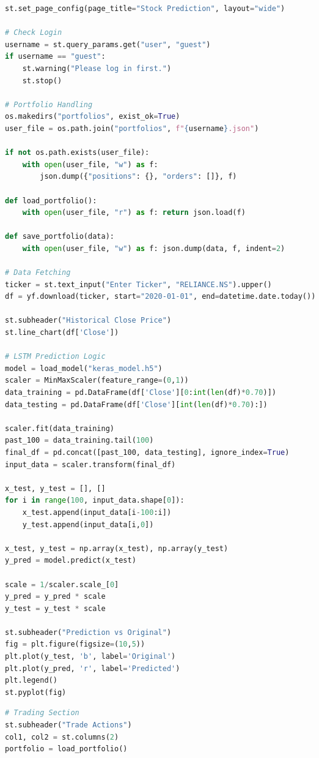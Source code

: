 \documentclass[12pt, a4paper]{report}
\begin{document}
\begin{spacing}{1.2}
\begin{lstlisting}[language=Python, caption=Main Dashboard App (Part 1)]
st.set_page_config(page_title="Stock Prediction", layout="wide")

# Check Login
username = st.query_params.get("user", "guest")
if username == "guest":
    st.warning("Please log in first.")
    st.stop()

# Portfolio Handling
os.makedirs("portfolios", exist_ok=True)
user_file = os.path.join("portfolios", f"{username}.json")

if not os.path.exists(user_file):
    with open(user_file, "w") as f:
        json.dump({"positions": {}, "orders": []}, f)

def load_portfolio():
    with open(user_file, "r") as f: return json.load(f)

def save_portfolio(data):
    with open(user_file, "w") as f: json.dump(data, f, indent=2)

# Data Fetching
ticker = st.text_input("Enter Ticker", "RELIANCE.NS").upper()
df = yf.download(ticker, start="2020-01-01", end=datetime.date.today())

st.subheader("Historical Close Price")
st.line_chart(df['Close'])

# LSTM Prediction Logic
model = load_model("keras_model.h5")
scaler = MinMaxScaler(feature_range=(0,1))
data_training = pd.DataFrame(df['Close'][0:int(len(df)*0.70)])
data_testing = pd.DataFrame(df['Close'][int(len(df)*0.70):])

scaler.fit(data_training)
past_100 = data_training.tail(100)
final_df = pd.concat([past_100, data_testing], ignore_index=True)
input_data = scaler.transform(final_df)

x_test, y_test = [], []
for i in range(100, input_data.shape[0]):
    x_test.append(input_data[i-100:i])
    y_test.append(input_data[i,0])

x_test, y_test = np.array(x_test), np.array(y_test)
y_pred = model.predict(x_test)

scale = 1/scaler.scale_[0]
y_pred = y_pred * scale
y_test = y_test * scale

st.subheader("Prediction vs Original")
fig = plt.figure(figsize=(10,5))
plt.plot(y_test, 'b', label='Original')
plt.plot(y_pred, 'r', label='Predicted')
plt.legend()
st.pyplot(fig)
\end{lstlisting}

\begin{lstlisting}[language=Python, caption=Main Dashboard App (Part 2 - Trading Logic)]
# Trading Section
st.subheader("Trade Actions")
col1, col2 = st.columns(2)
portfolio = load_portfolio()


\end{lstlisting}
\end{spacing}
\end{document}
